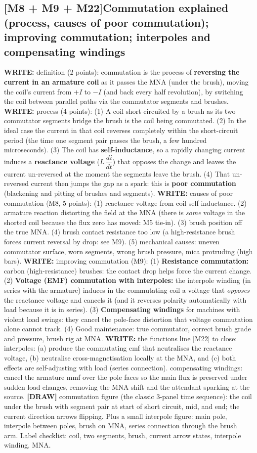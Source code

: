 \documentclass[11pt]{article}
\newcommand{\q}[2]{\subsection*{\color{copper}#1\quad\color{iron}#2}}
\newcommand{\w}[1]{\textbf{\color{copper}WRITE:} #1}
\newcommand{\dw}[1]{\textbf{\color{muted}[DRAW]} #1}
\begin{document}
\q{[M8 + M9 + M22]}{Commutation explained (process, causes of poor commutation); improving commutation; interpoles and compensating windings}
\w{definition (2 points):} commutation is the process of \textbf{reversing the current in an armature coil} as it passes the MNA (under the brush), moving the coil's current from $+I$ to $-I$ (and back every half revolution), by switching the coil between parallel paths via the commutator segments and brushes.
\w{process (4 points):} (1) A coil short-circuited by a brush as its two commutator segments bridge the brush is the coil being commutated. (2) In the ideal case the current in that coil reverses completely within the short-circuit period (the time one segment pair passes the brush, a few hundred microseconds). (3) The coil has \textbf{self-inductance}, so a rapidly changing current induces a \textbf{reactance voltage} ($L\,\dfrac{di}{dt}$) that opposes the change and leaves the current un-reversed at the moment the segments leave the brush. (4) That un-reversed current then jumps the gap as a spark: this is \textbf{poor commutation} (blackening and pitting of brushes and segments).
\w{causes of poor commutation (M8, 5 points):} (1) reactance voltage from coil self-inductance. (2) armature reaction distorting the field at the MNA (there is \emph{some} voltage in the shorted coil because the flux zero has moved: M5 tie-in). (3) brush position off the true MNA. (4) brush contact resistance too low (a high-resistance brush forces current reversal by drop: see M9). (5) mechanical causes: uneven commutator surface, worn segments, wrong brush pressure, mica protruding (high bars).
\w{improving commutation (M9):} (1) \textbf{Resistance commutation:} carbon (high-resistance) brushes: the contact drop helps force the current change. (2) \textbf{Voltage (EMF) commutation with interpoles:} the interpole winding (in series with the armature) induces in the commutating coil a voltage that \emph{opposes} the reactance voltage and cancels it (and it reverses polarity automatically with load because it is in series). (3) \textbf{Compensating windings} for machines with violent load swings: they cancel the pole-face distortion that voltage commutation alone cannot track. (4) Good maintenance: true commutator, correct brush grade and pressure, brush rig at MNA.
\w{the functions line [M22] to close:} interpoles: (a) produce the commutating emf that neutralises the reactance voltage, (b) neutralise cross-magnetisation locally at the MNA, and (c) both effects are self-adjusting with load (series connection). compensating windings: cancel the armature mmf over the pole faces so the main flux is preserved under sudden load changes, removing the MNA shift and the attendant sparking at the source.
\dw{commutation figure (the classic 3-panel time sequence): the coil under the brush with segment pair at start of short circuit, mid, and end; the current direction arrows flipping. Plus a small interpole figure: main pole, interpole between poles, brush on MNA, series connection through the brush arm. Label checklist: coil, two segments, brush, current arrow states, interpole winding, MNA.}
\end{document}
